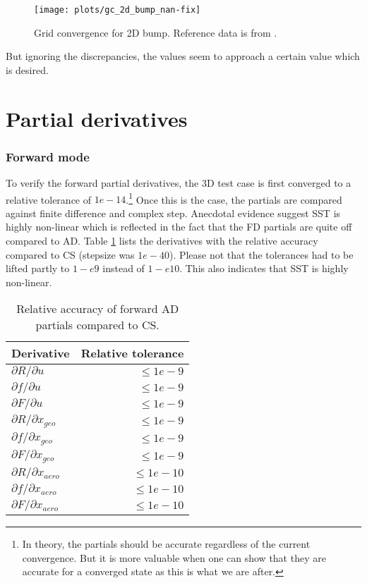\begin{figure}[H] \centering
    \texttt{[image: plots/gc\_2d\_bump\_nan-fix]}
    \caption{Grid convergence for 2D bump. Reference data is from
    \cite{nasatmr}.}
    \label{fig:gc_2d_bump}
\end{figure}

\noindent But ignoring the discrepancies, the values seem to approach a certain
value which is desired.








\section{Partial derivatives}
\subsubsection{Forward mode}
To verify the forward partial derivatives, the 3D test case is first converged
to a relative tolerance of $1e-14$.\footnote{In theory, the partials should be
accurate regardless of the current convergence. But it is more valuable when
one can show that they are accurate for a converged state as this is what we
are after. } Once this is the case, the partials are compared against finite
difference and complex step. Anecdotal evidence suggest SST is highly
non-linear which is reflected in the fact that the FD partials are quite off
compared to AD. Table \ref{tab:partials_forward} lists the derivatives with the
relative accuracy compared to CS (stepsize was $1e-40$). Please not that the
tolerances had to be lifted partly to $1-e9$ instead of $1-e10$. This also
indicates that SST is highly non-linear.

\begin{table}[H]
    \centering
    \begin{tabular}{l r}
        \toprule
        Derivative                          & Relative tolerance \\
        \hline
        $\partial R / \partial u$           & $\leq 1e-9$ \\
        $\partial f / \partial u$           & $\leq 1e-9$ \\
        $\partial F / \partial u$           & $\leq 1e-9$ \\
        $\partial R / \partial x_{geo}$     & $\leq 1e-9$ \\
        $\partial f / \partial x_{geo}$     & $\leq 1e-9$ \\
        $\partial F / \partial x_{geo}$     & $\leq 1e-9$ \\
        $\partial R / \partial x_{aero}$    & $\leq 1e-10$ \\
        $\partial f / \partial x_{aero}$    & $\leq 1e-10$ \\
        $\partial F / \partial x_{aero}$    & $\leq 1e-10$ \\
        \bottomrule
    \end{tabular}
    \caption{Relative accuracy of forward AD partials compared to CS.}
    \label{tab:partials_forward}
\end{table}


